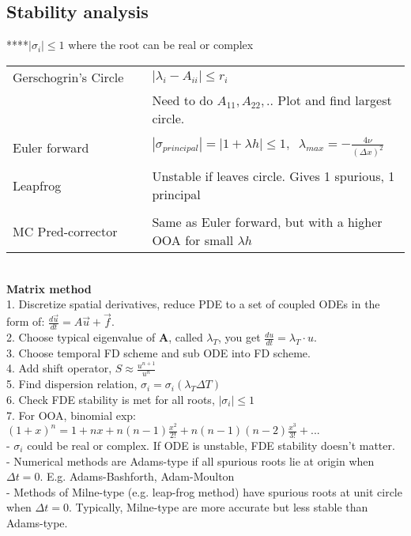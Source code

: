 \documentclass[8pt]{extarticle} %
\begin{document}
\begin{multicols*}{3}
 \subsection{Stability analysis}
 ****$|\sigma_i|\leq1$ where the root can be real or complex\\
  \begin{tabular}{L{0.35\linewidth} L{0.7\linewidth}}
  Gerschogrin's Circle & $|\lambda_i-A_{ii}|\leq r_i$\\
   & Need to do $A_{11}, A_{22},..$ Plot and find largest circle.\\
   \\[-0.9em]
  Euler forward & $|\sigma_{principal}|=|1+\lambda h|\leq1,\;\;\lambda_{max}=-\frac{4\nu}{(\Delta x)^2}$\\
  \\[-0.9em]
  Leapfrog & Unstable if leaves circle. Gives 1 spurious, 1 principal\\
  \\[-0.9em]
  MC Pred-corrector & Same as Euler forward, but with a higher OOA for small $\lambda h$\\
 \end{tabular}\\
 \textbf{Matrix method}\\
 1. Discretize spatial derivatives, reduce PDE to a set of coupled ODEs in the form of: $\frac{d\vec{u}}{dt}=A\vec{u}+\vec{f}$.\\
 2. Choose typical eigenvalue of \textbf{A}, called $\lambda_T$, you get $\frac{du}{dt}=\lambda_T\cdot u$.\\
 3. Choose temporal FD scheme and sub ODE into FD scheme.\\
 4. Add shift operator, $S\approx\frac{u^{n+1}}{u^n}$\\
 5. Find dispersion relation, $\sigma_i=\sigma_i(\lambda_T\Delta T)$\\
 6. Check FDE stability is met for all roots, $|\sigma_i|\leq1$\\
 \vspace{1ex}
 7. For OOA, binomial exp: $(1+x)^n=1+nx+n(n-1)\frac{x^2}{2!}+n(n-1)(n-2)\frac{x^3}{3!}+...$\\
 - $\sigma_i $ could be real or complex. If ODE is unstable, FDE stability doesn't matter.\\
 - Numerical methods are Adams-type if all spurious roots lie at origin when $\Delta t=0$. E.g. Adams-Bashforth, Adam-Moulton\\
 - Methods of Milne-type (e.g. leap-frog method) have spurious roots at unit circle when $\Delta t=0$. Typically, Milne-type are more accurate but less stable than Adams-type.\\

\end{multicols*}
\end{document}
